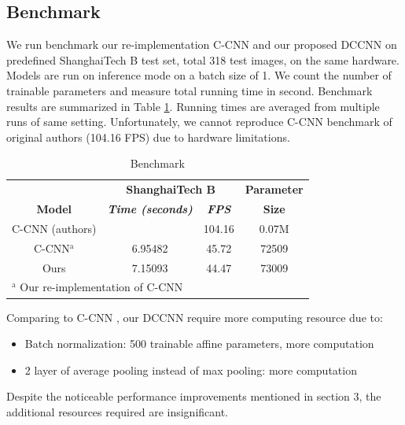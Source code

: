 
\subsection{Benchmark}

We run benchmark our re-implementation C-CNN \cite{9053780} and our proposed DCCNN on predefined ShanghaiTech B test set, total 318 test images, on the same hardware. Models are run on inference mode on a batch size of 1. We count the number of trainable parameters and measure total running time in second. Benchmark results are summarized in Table \ref{tab:benchmark-result}. Running times are averaged from multiple runs of same setting. Unfortunately, we cannot reproduce C-CNN benchmark of original authors \cite{9053780} (104.16 FPS) due to hardware limitations. 

\begin{table}[htbp]
\caption{\label{tab:benchmark-result}  Benchmark}
\begin{center}
\begin{tabular}{|c|c|c|c|}
\hline
\textbf{}&\multicolumn{2}{|c|}{\textbf{ShanghaiTech B}}&\textbf{Parameter} \\
\cline{1-3}
\textbf{Model} & \textbf{\textit{ Time (seconds) }}& \textbf{\textit{FPS}}&\textbf{Size} \\
\hline
C-CNN (authors) &  &  104.16 & 0.07M \\
\hline
C-CNN$^{\mathrm{a}}$  & 6.95482 & 45.72 & 72509   \\
\hline
Ours &  7.15093 & 44.47 & 73009 \\
\hline
\multicolumn{4}{l}{$^{\mathrm{a}}$ Our re-implementation of C-CNN}
\end{tabular}

\end{center}
\end{table}

Comparing to C-CNN \cite{9053780}, our DCCNN require more computing resource due to: 
\begin{itemize}
    \item Batch normalization: 500 trainable affine parameters, more computation
    \item 2 layer of average pooling instead of max pooling: more computation 
\end{itemize}

Despite the noticeable performance improvements mentioned in section 3, the additional resources required are insignificant.